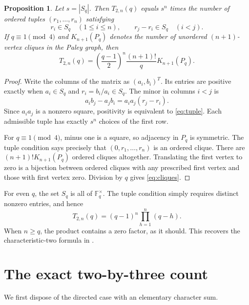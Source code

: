 \documentclass[11pt]{article}
\newtheorem{proposition}[theorem]{Proposition}
\newcommand{\F}{\mathbb F}
\begin{document}
\begin{proposition}\label{prop:normalization}
Let $s=|S_q|$. Then $T_{2,n}(q)$ equals $s^n$ times the number of ordered tuples $(r_1,\ldots,r_n)$ satisfying
\begin{equation}\label{eq:tuple}
 r_i\in S_q\quad(1\le i\le n),\qquad
 r_j-r_i\in S_q\quad(i<j).
\end{equation}
If $q\equiv1\pmod4$ and $K_{n+1}(P_q)$ denotes the number of unordered $(n+1)$-vertex cliques in the Paley graph, then
\begin{equation}\label{eq:cliques}
 T_{2,n}(q)=\left(\frac{q-1}{2}\right)^n
 \frac{(n+1)!}{q}K_{n+1}(P_q).
\end{equation}
\end{proposition}
\begin{proof}
Write the columns of the matrix as $(a_i,b_i)^T$. Its entries are positive exactly when $a_i\in S_q$ and $r_i=b_i/a_i\in S_q$. The minor in columns $i<j$ is
\[
 a_ib_j-a_jb_i=a_ia_j(r_j-r_i).
\]
Since $a_ia_j$ is a nonzero square, positivity is equivalent to \eqref{eq:tuple}. Each admissible tuple has exactly $s^n$ choices of the first row.

For $q\equiv1\pmod4$, minus one is a square, so adjacency in $P_q$ is symmetric. The tuple condition says precisely that $(0,r_1,\ldots,r_n)$ is an ordered clique. There are $(n+1)!K_{n+1}(P_q)$ ordered cliques altogether. Translating the first vertex to zero is a bijection between ordered cliques with any prescribed first vertex and those with first vertex zero. Division by $q$ gives \eqref{eq:cliques}.
\end{proof}

For even $q$, the set $S_q$ is all of $\F_q^\times$. The tuple condition simply requires distinct nonzero entries, and hence
\begin{equation}\label{eq:even}
 T_{2,n}(q)=(q-1)^n\prod_{h=1}^n(q-h).
\end{equation}
When $n\ge q$, the product contains a zero factor, as it should. This recovers the characteristic-two formula in \cite[Section~5.1]{AP}.

\section{The exact two-by-three count}
We first dispose of the directed case with an elementary character sum.
\end{document}
